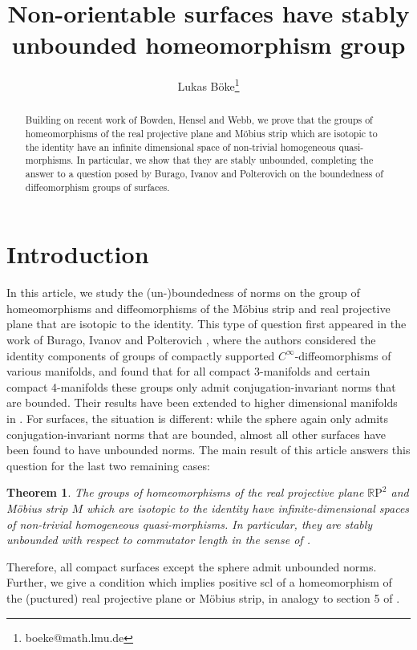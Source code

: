 \documentclass[a4paper]{article}
\title{Non-orientable surfaces have stably unbounded homeomorphism group}
\author{Lukas Böke\footnote{boeke@math.lmu.de}}
\date{}
\newtheorem{theorem}{Theorem}[section]
\newcommand{\rp}{\mathbb{R}\mathrm{P}^2}
\begin{document}
\maketitle

\begin{abstract}
Building on recent work of Bowden, Hensel and Webb, we prove that the groups of homeomorphisms of the real projective plane and Möbius strip which are isotopic to the identity have an infinite dimensional space of non-trivial homogeneous quasi-morphisms.
In particular, we show that they are stably unbounded, completing the answer to a question posed by Burago, Ivanov and Polterovich on the boundedness of diffeomorphism groups of surfaces.
\end{abstract}

\section{Introduction}
In this article, we study the (un-)boundedness of norms on the group of homeomorphisms and diffeomorphisms of the Möbius strip and real projective plane that are isotopic to the identity.
This type of question first appeared in the work of Burago, Ivanov and Polterovich \cite{BIP}, where the authors considered the identity components of groups of compactly supported $C^\infty$-diffeomorphisms of various manifolds, and found that for all compact 3-manifolds and certain compact 4-manifolds these groups only admit conjugation-invariant norms that are bounded.
Their results have been extended to higher dimensional manifolds in \cite{tsuboi}.
For surfaces, the situation is different:
while the sphere again only admits conjugation-invariant norms that are bounded, almost all other surfaces have been found to have unbounded norms.
The main result of this article answers this question for the last two remaining cases: 

\begin{theorem}\label{thm:intro}
The groups of homeomorphisms of the real projective plane $\rp$ and Möbius strip $M$ which are isotopic to the identity have infinite-dimensional spaces of non-trivial homogeneous quasi-morphisms.
In particular, they are stably unbounded with respect to commutator length in the sense of \cite{BIP}.
\end{theorem}

Therefore, all compact surfaces except the sphere admit unbounded norms.
Further, we give a condition which implies positive scl of a homeomorphism of the (puctured) real projective plane or Möbius strip, in analogy to section 5 of \cite{BHW2}.
\end{document}
